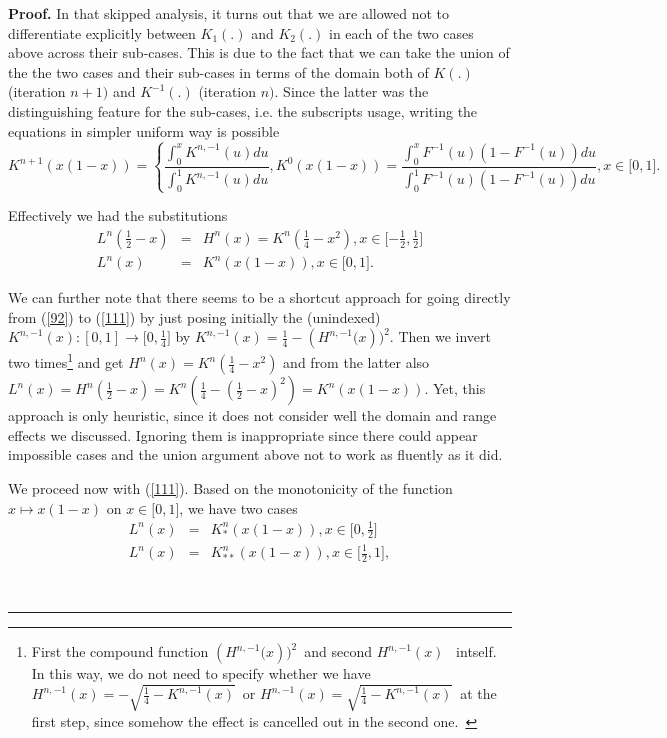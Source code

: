 \documentclass[onecolumn]{article}
\providecommand{\dint}{\displaystyle\int}
\newenvironment{proof}[1][Proof]{\noindent\textbf{#1.} }{\ \rule{0.5em}{0.5em}}
\renewcommand{\dint}{\displaystyle\int}
\begin{document}
\begin{proof}
In that skipped analysis, it turns out that we are allowed not to
differentiate explicitly between $K_{1}(.)$ and $K_{2}(.)$ in each of the
two cases above across their sub-cases. This is due to the fact that we can
take the union of the the two cases and their sub-cases in terms of the
domain both of $K(.)$ (iteration $n+1)$ and $K^{-1}(.)$ (iteration $n).$
Since the latter was the distinguishing feature for the sub-cases, i.e. the
subscripts usage, writing the equations in simpler uniform way is possible%
\begin{equation}
K^{n+1}\left( x(1-x)\right) =\left\{ \frac{\dint%
\nolimits_{0}^{x}K^{n,-1}(u)du}{\dint\nolimits_{0}^{1}K^{n,-1}(u)du}%
,K^{0}(x(1-x))=\frac{\dint\nolimits_{0}^{x}F^{-1}(u)\left(
1-F^{-1}(u)\right) du}{\dint\nolimits_{0}^{1}F^{-1}(u)\left(
1-F^{-1}(u)\right) du},x\in \lbrack 0,1].\right.  \label{111}
\end{equation}

Effectively we had the substitutions%
\begin{eqnarray}
L^{n}(\frac{1}{2}-x) &=&H^{n}(x)=K^{n}(\frac{1}{4}-x^{2}),x\in \lbrack -%
\frac{1}{2},\frac{1}{2}]  \label{112} \\
L^{n}\left( x\right) &=&K^{n}(x(1-x)),x\in \lbrack 0,1].  \label{113}
\end{eqnarray}

We can further note that there seems to be a shortcut approach for going
directly from (\ref{92}) to (\ref{111}) by just posing initially the
(unindexed) $K^{n,-1}(x):[0,1]\rightarrow \lbrack 0,\frac{1}{4}]$ by $%
K^{n,-1}(x)=\frac{1}{4}-\left( H^{n,-1}(x\right) )^{2}$. Then we invert two
times\footnote{{\footnotesize First the compound function }$\left(
H^{n,-1}(x\right) )^{2}${\footnotesize \ and second }$H^{n,-1}(x)$%
{\footnotesize \ intself. In this way, we do not need to specify whether we
have }$H^{n,-1}(x)=-\sqrt{\frac{1}{4}-K^{n,-1}(x)}${\footnotesize \ or }$%
H^{n,-1}(x)=\sqrt{\frac{1}{4}-K^{n,-1}(x)}${\footnotesize \ at the first
step, since somehow the effect is cancelled out in the second one.\ }} and
get $H^{n}(x)=K^{n}(\frac{1}{4}-x^{2})$ and from the latter also $%
L^{n}(x)=H^{n}(\frac{1}{2}-x)=K^{n}(\frac{1}{4}-(\frac{1}{2}%
-x)^{2})=K^{n}(x(1-x))$. Yet, this approach is only heuristic, since it does
not consider well the domain and range effects we discussed. Ignoring them
is inappropriate since there could appear impossible cases and the union
argument above not to work as fluently as it did.

We proceed now with (\ref{111}). Based on the monotonicity of the function $%
x\longmapsto x(1-x)$ on $x\in \lbrack 0,1]$, we have two cases%
\begin{eqnarray}
L^{n}\left( x\right) &=&K_{\ast }^{n}(x(1-x)),x\in \lbrack 0,\frac{1}{2}]
\label{136} \\
L^{n}\left( x\right) &=&K_{\ast \ast }^{n}(x(1-x)),x\in \lbrack \frac{1}{2}%
,1],  \label{137}
\end{eqnarray}


\end{proof}
\end{document}
